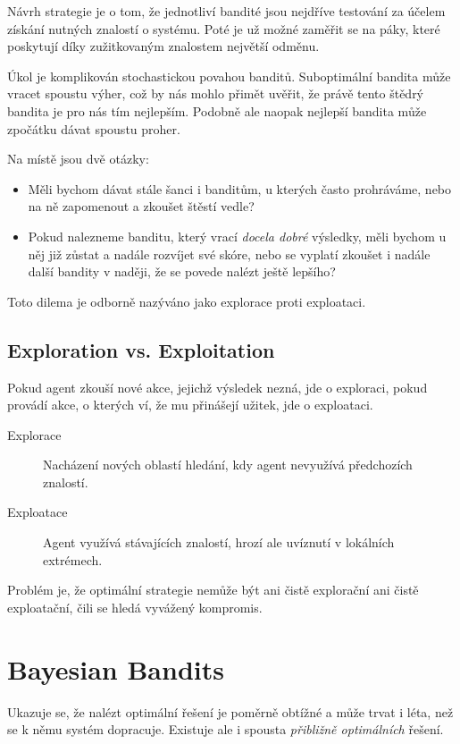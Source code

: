 \documentclass[thesis=M,czech]{FITthesis}[2014/05/07]
\begin{document}
Návrh strategie je o tom, že jednotliví bandité jsou nejdříve testování za účelem získání nutných znalostí o systému. Poté je už možné zaměřit se na páky, které poskytují díky zužitkovaným znalostem největší odměnu. 

Úkol je komplikován stochastickou povahou banditů. Suboptimální bandita může vracet spoustu výher, což by nás mohlo přimět uvěřit, že právě tento štědrý bandita je pro nás tím nejlepším. Podobně ale naopak nejlepší bandita může zpočátku dávat spoustu proher.

Na místě jsou dvě otázky:

\begin{itemize}
	\item Měli bychom dávat stále šanci i banditům, u kterých často prohráváme, nebo na ně zapomenout a zkoušet štěstí vedle?
	\item Pokud nalezneme banditu, který vrací \emph{docela dobré} výsledky, měli bychom u něj již zůstat a nadále rozvíjet své skóre, nebo se vyplatí zkoušet i nadále další bandity v naději, že se povede nalézt ještě lepšího?
\end{itemize}

Toto dilema je odborně nazýváno jako explorace proti exploataci.

\subsection{Exploration vs. Exploitation}
\label{sub:explo}

Pokud agent zkouší nové akce, jejichž výsledek nezná, jde o exploraci, pokud provádí akce, o kterých ví, že mu přinášejí užitek, jde o exploataci. 

\begin{description}
  \item[Explorace] Nacházení nových oblastí hledání, kdy agent nevyužívá předchozích znalostí.
  \item[Exploatace] Agent využívá stávajících znalostí, hrozí ale uvíznutí v lokálních extrémech.
\end{description}	

Problém je, že optimální strategie nemůže být ani čistě explorační ani čistě exploatační, čili se hledá vyvážený kompromis. 

\section{Bayesian Bandits}

Ukazuje se, že nalézt optimální řešení je poměrně obtížné a může trvat i léta, než se k němu systém dopracuje. Existuje ale i spousta \emph{přibližně optimálních} řešení.
\end{document}
